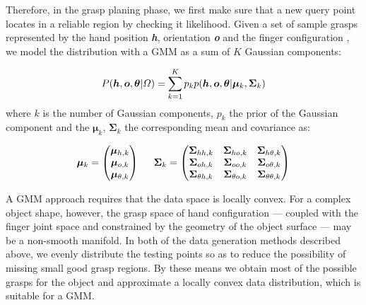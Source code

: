Therefore, in the grasp planing phase, we first make sure that a new query point locates in a reliable region by checking it likelihood.
Given a set of sample grasps represented by the hand position \textbf{\emph{h}},  orientation \textbf{\emph{o}} and the finger configuration \boldsymbol{$\theta$}, we model the distribution with a GMM as a sum of $K$ Gaussian components:


\begin{equation}
{
P (\boldsymbol{h},\boldsymbol{o},\boldsymbol\theta \text{\textbar} \varOmega)
= \sum_{k=1}^K {p_{k}p(\boldsymbol{h},\boldsymbol{o},\boldsymbol{\theta} \text{\textbar} {\boldsymbol{\mu}_k}, {\boldsymbol{\Sigma}_k})}
}
\end{equation}
where $k$ is the number of Gaussian components, $p_k$ the prior of the Gaussian component and the $\boldsymbol{\mu}_k$, $\boldsymbol{\Sigma}_k$ the corresponding mean and covariance as:

\begin{equation}
{
\boldsymbol{\mu}_k = \begin{pmatrix}    \boldsymbol{\mu}_{h,k}     \\
                                        \boldsymbol{\mu}_{o,k}          \\
                                        \boldsymbol{\mu}_{\theta,k}
                    \end{pmatrix}
\hspace{0.2in}
\boldsymbol{\Sigma}_k = \begin{pmatrix}     \boldsymbol{\Sigma}_{hh,k}  & \boldsymbol{\Sigma}_{ho,k} & \boldsymbol{\Sigma}_{h\theta,k}  \\
                                            \boldsymbol{\Sigma}_{oh,k}  & \boldsymbol{\Sigma}_{oo,k}  & \boldsymbol{\Sigma}_{o\theta,k} \\
                                            \boldsymbol{\Sigma}_{\theta{h},k}   & \boldsymbol{\Sigma}_{\theta{o},k}   & \boldsymbol{\Sigma}_{\theta{\theta},k}
                        \end{pmatrix}
}
\end{equation}

A GMM approach requires that the data space is locally convex. For a complex object shape, however, the grasp space of hand configuration --- coupled with the finger joint space and constrained by the geometry of the object surface --- may be a non-smooth manifold. In both of the data generation methods described above, we evenly distribute the testing points so as to reduce the possibility of missing small good grasp regions. By these means we obtain most of the possible grasps for the object and approximate a locally convex data distribution, which is suitable for a GMM.

